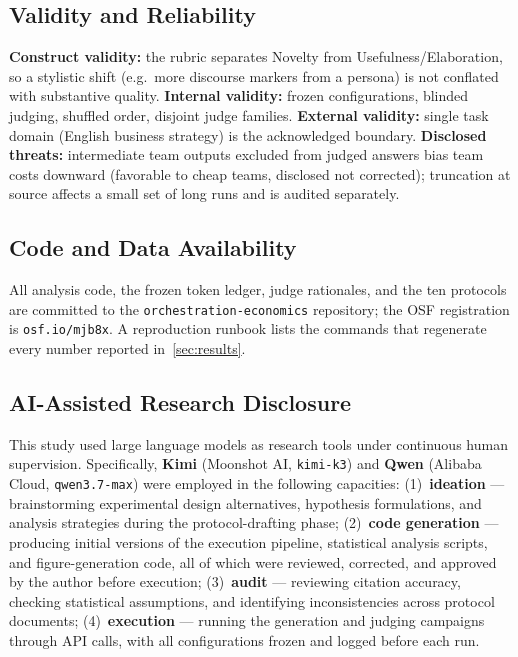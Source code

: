 \documentclass[12pt,a4paper]{article}
\begin{document}
\subsection{Validity and Reliability}

\textbf{Construct validity:} the rubric separates Novelty from
Usefulness/Elaboration, so a stylistic shift (e.g.\ more discourse markers from
a persona) is not conflated with substantive quality. \textbf{Internal validity:}
frozen configurations, blinded judging, shuffled order, disjoint judge families.
\textbf{External validity:} single task domain (English business strategy) is
the acknowledged boundary. \textbf{Disclosed threats:} intermediate team outputs
excluded from judged answers bias team costs downward (favorable to cheap teams,
disclosed not corrected); truncation at source affects a small set of long runs
and is audited separately.

\subsection{Code and Data Availability}

All analysis code, the frozen token ledger, judge rationales, and the ten
protocols are committed to the \texttt{orchestration-economics} repository; the
OSF registration is \texttt{osf.io/mjb8x}. A reproduction runbook
\citep{SandveEtAl2013} lists the commands that regenerate every number reported
in~\cref{sec:results}.

\subsection{AI-Assisted Research Disclosure}\label{sec:ai-disclosure}

This study used large language models as research tools under continuous human
supervision. Specifically, \textbf{Kimi} (Moonshot AI, \texttt{kimi-k3}) and
\textbf{Qwen} (Alibaba Cloud, \texttt{qwen3.7-max}) were employed in the
following capacities: (1)~\textbf{ideation} --- brainstorming experimental
design alternatives, hypothesis formulations, and analysis strategies during the
protocol-drafting phase; (2)~\textbf{code generation} --- producing initial
versions of the execution pipeline, statistical analysis scripts, and
figure-generation code, all of which were reviewed, corrected, and approved by
the author before execution; (3)~\textbf{audit} --- reviewing citation accuracy,
checking statistical assumptions, and identifying inconsistencies across
protocol documents; (4)~\textbf{execution} --- running the generation and
judging campaigns through API calls, with all configurations frozen and logged
before each run.
\end{document}
